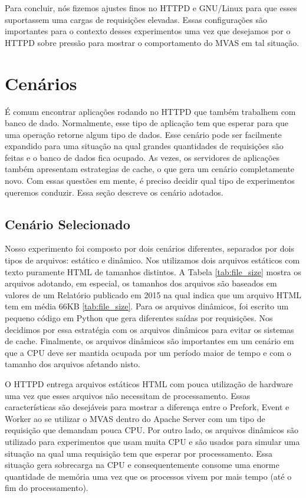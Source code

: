 Para concluir, nós fizemos ajustes finos no HTTPD e GNU/Linux para que esses
suportassem uma cargas de requisições elevadas. Essas configurações são
importantes para o contexto desses experimentos uma vez que desejamos por o
HTTPD sobre pressão para mostrar o comportamento do MVAS em tal situação.

\section{Cenários}

É comum encontrar aplicações rodando no HTTPD que também trabalhem com banco de
dado. Normalmente, esse tipo de aplicação tem que esperar para que uma
operação retorne algum tipo de dados. Esse cenário pode ser facilmente
expandido para uma situação na qual grandes quantidades de requisições são
feitas e o banco de dados fica ocupado. As vezes, os servidores de aplicações
também apresentam estrategias de cache, o que gera um cenário completamente
novo. Com essas questões em mente, é preciso decidir qual tipo de experimentos
queremos conduzir. Essa seção descreve os cenário adotados.

\subsection{Cenário Selecionado} \label{sec:scenarios}



Nosso experimento foi composto por dois cenários diferentes, separados por dois
tipos de arquivos: estático e dinâmico. Nos utilizamos dois arquivos estáticos
com texto puramente HTML de tamanhos distintos. A Tabela \ref{tab:file_size}
mostra os arquivos adotando, em especial, os tamanhos dos arquivos são baseados
em valores de um Relatório publicado em 2015 na qual indica que um arquivo HTML
tem em média 66KB \ref{tab:file_size}. Para os arquivos dinâmicos, foi escrito
um pequeno código em Python que gera diferentes saídas por requisições. Nos
decidimos por essa estratégia com os arquivos dinâmicos para evitar os sistemas
de cache. Finalmente, os arquivos dinâmicos são importantes em um cenário em
que a CPU deve ser mantida ocupada por um período maior de tempo e com o
tamanho dos arquivos afetando nisto.

O HTTPD entrega arquivos estáticos HTML com pouca utilização de hardware uma
vez que esses arquivos não necessitam de processamento. Essas características
são desejáveis para mostrar a diferença entre o Prefork, Event e Worker ao se
utilizar o MVAS dentro do Apache Server com um tipo de requisição que demandam
pouca CPU. Por outro lado, os arquivos dinâmicos são utilizado para
experimentos que usam muita CPU e são usados para simular uma situação na qual
uma requisição tem que esperar por processamento. Essa situação gera sobrecarga
na CPU e consequentemente consome uma enorme quantidade de memória uma vez que
os processos vivem por mais tempo (até o fim do processamento).

